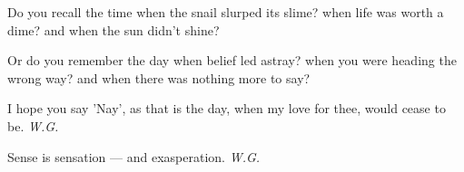 Do you recall the time
when the snail slurped its slime?
when life was worth a dime?
and when the sun didn't shine?

Or do you remember the day
when belief led astray?
when you were heading the wrong way?
and when there was nothing more to say?

I hope you say 'Nay',
as that is the day,
when my love for thee,
would cease to be. 
\emph{W.G.}

Sense is sensation --- and exasperation. 
\emph{W.G.}

